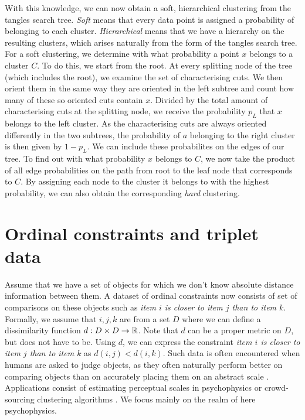 With this knowledge, we can now obtain a soft, hierarchical clustering from the tangles search tree. 
\textit{Soft} means that every data point is assigned
a probability of belonging to each cluster. 
\textit{Hierarchical} means that we have a hierarchy on the resulting clusters, which arises naturally
from the form of the tangles search tree. 
For a soft clustering, we determine with what probability a point $x$ belongs to a cluster $C$. 
To do this, we start from the root. At every splitting node of the tree (which includes the root), we examine the set of characterising cuts.
We then orient them in the same way they are oriented in the left subtree and count how many of these so oriented cuts contain $x$. Divided by the total amount of characterising cuts at the
splitting node, we receive the probability $p_L$ that $x$ belongs to the left cluster. As the characterising cuts are always oriented differently in the two subtrees, the probability
of $a$ belonging to the right cluster is then given by $1 - p_L$. We can include these probabilites on the edges of our tree. 
To find out with what probability $x$ belongs to $C$, 
we now take the product of all edge probabilities on the path from root to the leaf node that corresponds to $C$. 
By assigning each node to the cluster it belongs to with the highest probability, we can also obtain the corresponding \textit{hard} clustering.

\section{Ordinal constraints and triplet data}
Assume that we have a set of objects for which we don't know absolute distance information
between them. 
A dataset of ordinal constraints now consists of set of comparisons on these
objects such as \textit{item $i$ is closer to item $j$ than to item $k$}. 
Formally, we assume that $i, j, k$ are from 
a set $D$ where we can define a dissimilarity function $d: D \times D \to \mathbb{R}$. Note that $d$ can be a proper metric on $D$, but does not have to be.
Using $d$, we can express the constraint \textit{item $i$ is closer to item $j$ than to item $k$} 
as $d(i, j) < d(i, k)$. Such data is often encountered when humans are asked to judge objects, 
as they often naturally perform better on comparing objects
than on accurately placing them on an abstract scale \citep{demiralpLearningPerceptualKernels2014}. 
Applications consist of estimating perceptual scales in psychophysics 
\citep{haghiriEstimationPerceptualScales2020} or crowd-sourcing clustering algorithms \citep{ukkonenCrowdsourcedCorrelationClustering2017}. 
We focus mainly on the realm of here psychophysics.

